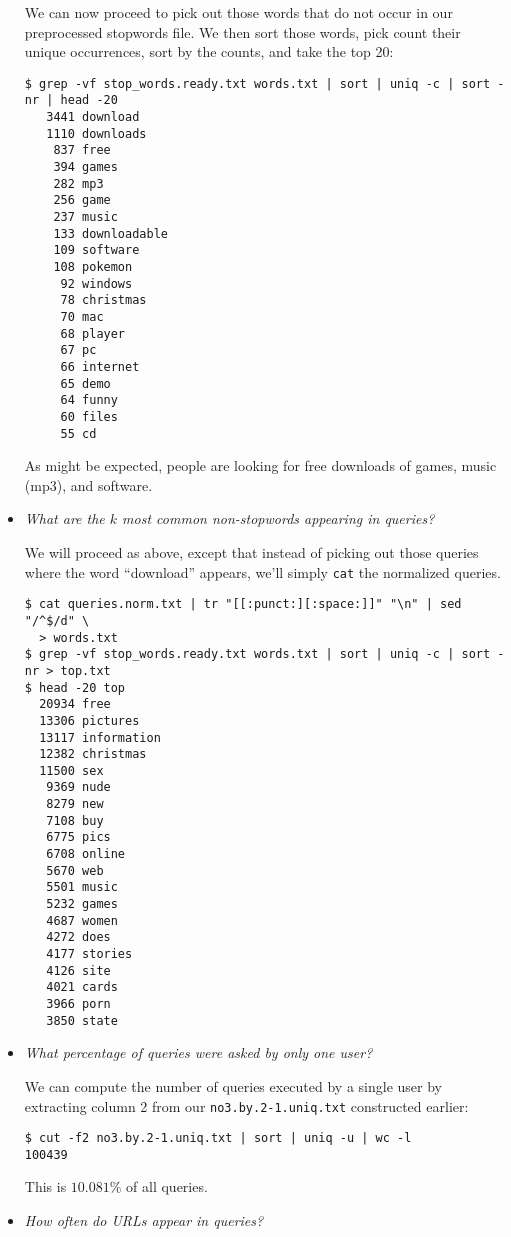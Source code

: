 \begin{itemize}
We can now proceed to pick out those words that do not occur in our
preprocessed stopwords file. We then sort those words, pick count their unique
occurrences, sort by the counts, and take the top 20:

\begin{lstlisting}
$ grep -vf stop_words.ready.txt words.txt | sort | uniq -c | sort -nr | head -20
   3441 download
   1110 downloads
    837 free
    394 games
    282 mp3
    256 game
    237 music
    133 downloadable
    109 software
    108 pokemon
     92 windows
     78 christmas
     70 mac
     68 player
     67 pc
     66 internet
     65 demo
     64 funny
     60 files
     55 cd
\end{lstlisting}

As might be expected, people are looking for free downloads of games, music
(mp3), and software. 

\item \emph{What are the $k$ most common non-stopwords appearing in queries?}

We will proceed as above, except that instead of picking out those queries
where the word ``download'' appears, we'll simply \texttt{cat} the normalized
queries.

\begin{lstlisting}
$ cat queries.norm.txt | tr "[[:punct:][:space:]]" "\n" | sed "/^$/d" \
  > words.txt
$ grep -vf stop_words.ready.txt words.txt | sort | uniq -c | sort -nr > top.txt
$ head -20 top
  20934 free
  13306 pictures
  13117 information
  12382 christmas
  11500 sex
   9369 nude
   8279 new
   7108 buy
   6775 pics
   6708 online
   5670 web
   5501 music
   5232 games
   4687 women
   4272 does
   4177 stories
   4126 site
   4021 cards
   3966 porn
   3850 state
\end{lstlisting}

\item \emph{What percentage of queries were asked by only one user?}

We can compute the number of queries executed by a single user by extracting
column 2 from our \texttt{no3.by.2-1.uniq.txt} constructed
earlier:

\begin{lstlisting}
$ cut -f2 no3.by.2-1.uniq.txt | sort | uniq -u | wc -l
100439
\end{lstlisting}

This is $10.081\%$ of all queries.

\item \emph{How often do URLs appear in queries?}


\end{itemize}
